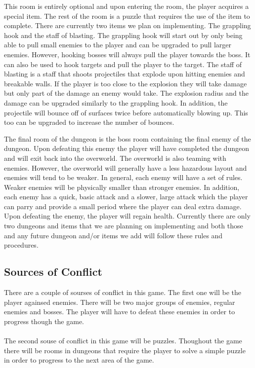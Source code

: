 \documentclass[titlepage]{article}
\begin{document}
This room is entirely optional and upon entering the room, the player acquires a special 
item. The rest of the room is a puzzle that requires the use of the item to complete. There 
are currently two items we plan on implementing. The grappling hook and the staff of blasting. 
The grappling hook will start out by only being able to pull small enemies to the player and 
can be upgraded to pull larger enemies. However, hooking bosses will always pull the player 
towards the boss. It can also be used to hook targets and pull the player to the target. The 
staff of blasting is a staff that shoots projectiles that explode upon hitting enemies and breakable 
walls. If the player is too close to the explosion they will take damage but only part of the 
damage an enemy would take. The explosion radius and the damage can be upgraded similarly
 to the grappling hook. In addition, the projectile will bounce off of surfaces twice before automatically
  blowing up. This too can be upgraded to increase the number of bounces.

The final room of the dungeon is the boss room containing the final enemy of the dungeon. 
Upon defeating this enemy the player will have completed the dungeon and will exit back into 
the overworld. The overworld is also teaming with enemies. However, the overworld will generally 
have a less hazardous layout and enemies will tend to be weaker. In general, each enemy will 
have a set of rules. Weaker enemies will be physically smaller than stronger enemies. In addition, 
each enemy has a quick, basic attack and a slower, large attack which the player can parry and 
provide a small period where the player can deal extra damage. Upon defeating the enemy, the player 
will regain health. Currently there are only two dungeons and items that we are planning on implementing 
and both those and any future dungeon and/or items we add will follow these rules and procedures.


\subsection{Sources of Conflict}
There are a couple of sourses of conflict in this game.  The first one will be the player againsed enemies.  
There will be two major groups of enemies, regular enemies and bosses.  The player will have to defeat these enemies 
in order to progress though the game.\\
\\
The second souse of conflict in this game will be puzzles.  Thoughout the game there will be rooms in dungeons 
that require the player to solve a simple puzzle in order to progress to the next area of the game.
\end{document}
